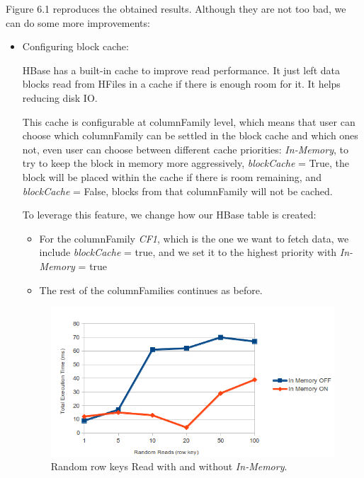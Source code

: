 \bigskip

Figure 6.1 reproduces the obtained results. Although they are not too bad, we can do some more improvements:
\begin{itemize}
\item Configuring block cache:
\par 
HBase has a built-in cache to improve read performance. It just left data blocks read from HFiles in a cache if there is enough room for it. It helps reducing disk IO.
\par
 This cache is configurable at columnFamily level, which means that user can choose which columnFamily can be settled in the block cache and which ones not, even user can choose between different cache priorities: \textit{In-Memory}, to try to keep the block in memory more aggressively, \textit{blockCache} = True, the block will be placed within the cache if there is room remaining, and \textit{blockCache} = False, blocks from that columnFamily will not be cached.
\par 
To leverage this feature, we change how our HBase table is created: 
\begin{itemize}
\item For the columnFamily \textit{CF1}, which is the one we want to fetch data, we include \textit{blockCache} = true, and we set it to the highest priority with \textit{In-Memory} = true
\item The rest of the columnFamilies continues as before.
\end{itemize}


\begin{figure}[htb]
\centering
\includegraphics[width=1\textwidth]{./images/inMemory2.png}
\caption{Random row keys Read with and without \textit{In-Memory}.} \label{fig:inMemoryReads}
\end{figure}



\end{itemize}
